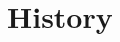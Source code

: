 \documentclass[12pt]{article}
\begin{document}
\newpage

\tableofcontents

\newpage



\section{History}
\end{document}
